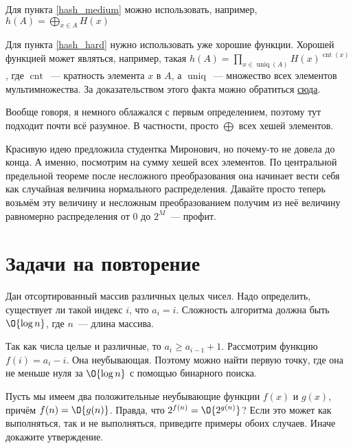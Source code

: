 \documentclass[addpoints]{exam}
\DeclareMathOperator{\uniq}{uniq}
\DeclareMathOperator{\cnt}{cnt}
\begin{document}
\begin{questions}
\begin{solution}
Для пункта \ref{hash_medium} можно использовать, например, $h(A) = \bigoplus\limits_{x \in A} H(x)$

Для пункта \ref{hash_hard} нужно использовать уже хорошие функции. Хорошей функцией может являться, например, такая $h(A) = \prod\limits_{x \in \uniq(A)} H(x)^{\cnt(x)}$, где $\cnt$~--- кратность элемента $x$ в $A$, а $\uniq$~--- множество всех элементов мультимножества. За доказательством этого факта можно обратиться \href{http://link.springer.com/chapter/10.1007%2F978-3-540-40061-5_12}{сюда}.

Вообще говоря, я немного облажался с первым определением, поэтому тут подходит почти всё разумное. В частности, просто $\bigoplus$ всех хешей элементов. 

Красивую идею предложила студентка Миронович, но почему-то не довела до конца. А именно, посмотрим на сумму хешей всех элементов. По центральной предельной теореме после несложного преобразования она начинает вести себя как случайная величина нормального распределения. Давайте просто теперь возьмём эту величину и несложным преобразованием получим из неё величину равномерно распределения от $0$ до $2^M$~--- профит. 

\end{solution}

\section{Задачи на повторение}

\question[\half] \label{binary_search} Дан отсортированный массив различных целых чисел. Надо определить, существует ли такой индекс $i$, что $a_i = i$. Сложность алгоритма должна быть $\O{\log{n}}$, где $n$~--- длина массива.

\begin{solution}

Так как числа целые и различные, то $a_i \geqslant a_{i - 1} + 1$. Рассмотрим функцию $f(i) = a_i - i$. Она неубывающая. Поэтому можно найти первую точку, где она не меньше нуля за $\O{\log{n}}$ с помощью бинарного поиска.

\end{solution}

\question[\half] Пусть мы имеем два положительные неубывающие функции $f(x)$ и $g(x)$, причём $f(n) = \O{g(n)}$. Правда, что $2^{f(n)} = \O{2^{g(n)}}$? Если это может как выполняться, так и не выполняться, приведите примеры обоих случаев. Иначе докажите утверждение.

\begin{solution}


\end{solution}
\end{questions}
\end{document}
